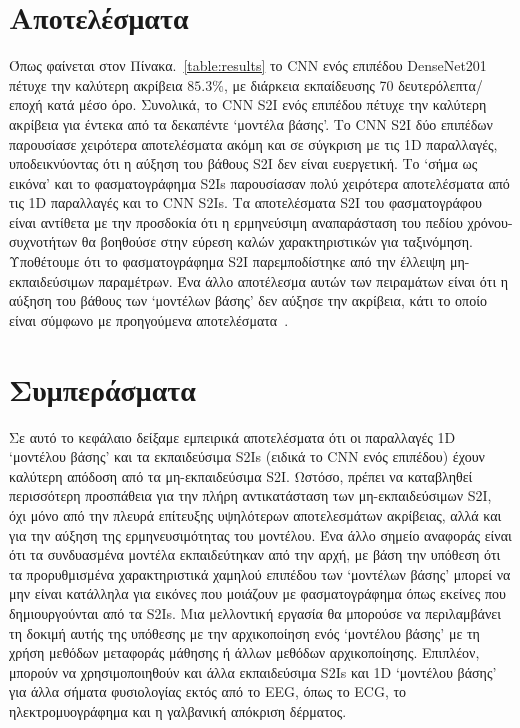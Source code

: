 \section{Αποτελέσματα}
Όπως φαίνεται στον Πίνακα.~\ref{table:results} το CNN ενός επιπέδου DenseNet201 πέτυχε την καλύτερη ακρίβεια $85.3\%$, με διάρκεια εκπαίδευσης 70 δευτερόλεπτα/εποχή κατά μέσο όρο.
Συνολικά, το CNN S2I ενός επιπέδου πέτυχε την καλύτερη ακρίβεια για έντεκα από τα δεκαπέντε `μοντέλα βάσης'.
Το CNN S2I δύο επιπέδων παρουσίασε χειρότερα αποτελέσματα ακόμη και σε σύγκριση με τις 1D παραλλαγές, υποδεικνύοντας ότι η αύξηση του βάθους S2I δεν είναι ευεργετική.
Το `σήμα ως εικόνα' και το φασματογράφημα S2Is παρουσίασαν πολύ χειρότερα αποτελέσματα από τις 1D παραλλαγές και το CNN S2Is.
Τα αποτελέσματα S2I του φασματογράφου είναι αντίθετα με την προσδοκία ότι η ερμηνεύσιμη αναπαράσταση του πεδίου χρόνου-συχνοτήτων θα βοηθούσε στην εύρεση καλών χαρακτηριστικών για ταξινόμηση.
Υποθέτουμε ότι το φασματογράφημα S2I παρεμποδίστηκε από την έλλειψη μη-εκπαιδεύσιμων παραμέτρων.
Ένα άλλο αποτέλεσμα αυτών των πειραμάτων είναι ότι η αύξηση του βάθους των `μοντέλων βάσης' δεν αύξησε την ακρίβεια, κάτι το οποίο είναι σύμφωνο με προηγούμενα αποτελέσματα~\cite{schirrmeister2017deep}.

\section{Συμπεράσματα}
Σε αυτό το κεφάλαιο δείξαμε εμπειρικά αποτελέσματα ότι οι παραλλαγές 1D `μοντέλου βάσης' και τα εκπαιδεύσιμα S2Is (ειδικά το CNN ενός επιπέδου) έχουν καλύτερη απόδοση από τα μη-εκπαιδεύσιμα S2I.
Ωστόσο, πρέπει να καταβληθεί περισσότερη προσπάθεια για την πλήρη αντικατάσταση των μη-εκπαιδεύσιμων S2I, όχι μόνο από την πλευρά επίτευξης υψηλότερων αποτελεσμάτων ακρίβειας, αλλά και για την αύξηση της ερμηνευσιμότητας του μοντέλου.
Ένα άλλο σημείο αναφοράς είναι ότι τα συνδυασμένα μοντέλα εκπαιδεύτηκαν από την αρχή, με βάση την υπόθεση ότι τα προρυθμισμένα χαρακτηριστικά χαμηλού επιπέδου των `μοντέλων βάσης' μπορεί να μην είναι κατάλληλα για εικόνες που μοιάζουν με φασματογράφημα όπως εκείνες που δημιουργούνται από τα S2Is.
Μια μελλοντική εργασία θα μπορούσε να περιλαμβάνει τη δοκιμή αυτής της υπόθεσης με την αρχικοποίηση ενός `μοντέλου βάσης' με τη χρήση μεθόδων μεταφοράς μάθησης ή άλλων μεθόδων αρχικοποίησης.
Επιπλέον, μπορούν να χρησιμοποιηθούν και άλλα εκπαιδεύσιμα S2Is και 1D `μοντέλου βάσης' για άλλα σήματα φυσιολογίας εκτός από το EEG, όπως το ECG, το ηλεκτρομυογράφημα και η γαλβανική απόκριση δέρματος.

\clearpage


